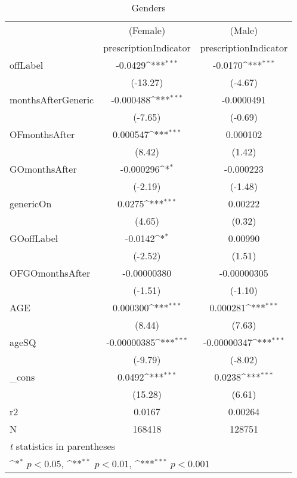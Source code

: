 \begin{table}[htbp]\centering
\def\sym#1{\ifmmode^{#1}\else\(^{#1}\)\fi}
\caption{Genders\label{tab1}}
\begin{tabular}{l*{2}{c}}
\hline\hline
            &\multicolumn{1}{c}{(Female)}&\multicolumn{1}{c}{(Male)}\\
            &\multicolumn{1}{c}{prescriptionIndicator}&\multicolumn{1}{c}{prescriptionIndicator}\\
\hline
offLabel    &     -0.0429\sym{***}&     -0.0170\sym{***}\\
            &    (-13.27)         &     (-4.67)         \\
[1em]
monthsAfterGeneric&   -0.000488\sym{***}&  -0.0000491         \\
            &     (-7.65)         &     (-0.69)         \\
[1em]
OFmonthsAfter&    0.000547\sym{***}&    0.000102         \\
            &      (8.42)         &      (1.42)         \\
[1em]
GOmonthsAfter&   -0.000296\sym{*}  &   -0.000223         \\
            &     (-2.19)         &     (-1.48)         \\
[1em]
genericOn   &      0.0275\sym{***}&     0.00222         \\
            &      (4.65)         &      (0.32)         \\
[1em]
GOoffLabel  &     -0.0142\sym{*}  &     0.00990         \\
            &     (-2.52)         &      (1.51)         \\
[1em]
OFGOmonthsAfter& -0.00000380         & -0.00000305         \\
            &     (-1.51)         &     (-1.10)         \\
[1em]
AGE         &    0.000300\sym{***}&    0.000281\sym{***}\\
            &      (8.44)         &      (7.63)         \\
[1em]
ageSQ       & -0.00000385\sym{***}& -0.00000347\sym{***}\\
            &     (-9.79)         &     (-8.02)         \\
[1em]
\_cons      &      0.0492\sym{***}&      0.0238\sym{***}\\
            &     (15.28)         &      (6.61)         \\
\hline
r2          &      0.0167         &     0.00264         \\
N           &      168418         &      128751         \\
\hline\hline
\multicolumn{3}{l}{\footnotesize \textit{t} statistics in parentheses}\\
\multicolumn{3}{l}{\footnotesize \sym{*} \(p<0.05\), \sym{**} \(p<0.01\), \sym{***} \(p<0.001\)}\\
\end{tabular}
\end{table}
